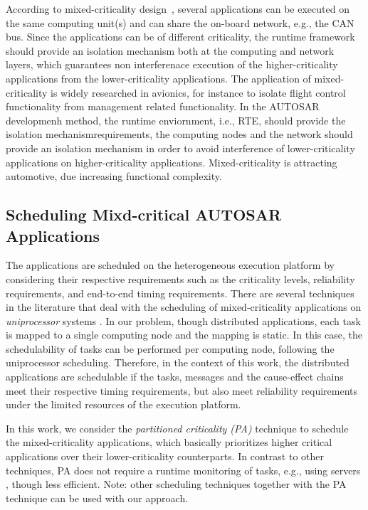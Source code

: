 According to mixed-criticality design~\cite{Vestal2007PreemptiveAssurance}, several applications can be executed on the same computing unit(s) and can share the on-board network, e.g., the CAN bus. Since the applications can be of different criticality, the runtime framework should provide an isolation mechanism both at the computing and network layers,  which guarantees non interferenace execution of the higher-criticality applications from the lower-criticality applications. The application of mixed-criticality is widely researched in avionics, for instance to isolate flight control functionality from management related functionality. In the AUTOSAR developmenh method, the runtime enviornment, i.e., RTE, should provide the isolation mechanismrequirements, the computing nodes and the network should provide an isolation mechanism in order to avoid interference of lower-criticality applications on higher-criticality applications. Mixed-criticality is attracting automotive, due increasing functional complexity. 

\subsection{Scheduling Mixd-critical AUTOSAR Applications}
The applications are scheduled on the heterogeneous execution platform by considering their respective requirements such as the criticality levels, reliability requirements, and end-to-end timing requirements. There are several techniques in the literature that deal with the scheduling of mixed-criticality applications on \textit{uniprocessor} systems \cite{Vestal2007PreemptiveAssurance}. In our problem, though distributed applications, each task is mapped to a single computing node and the mapping is static. In this case, the schedulability of tasks can be performed per computing node, following the uniprocessor scheduling. Therefore, in the context of this work, the distributed applications are schedulable if the tasks, messages and the cause-effect chains meet their respective timing requirements, but also meet reliability requirements under the limited resources of the execution platform.

In this work, we consider the \textit{partitioned criticality (PA)}  technique to schedule the mixed-criticality applications, which basically prioritizes higher critical applications over their lower-criticality counterparts. In contrast to other techniques, PA does not require a runtime monitoring of tasks, e.g., using servers \cite{AbeniIntegratingSystems,Ashjaei2017DesigningSystems,Inam2014ThePlatforms}, though less efficient. Note: other scheduling techniques together with the PA technique can be used with our approach.

